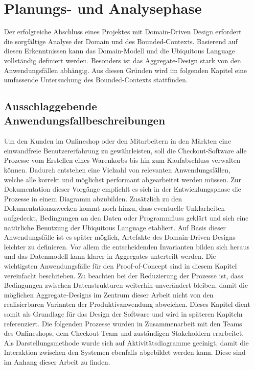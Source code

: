 

\chapter{Planungs- und Analysephase}

Der erfolgreiche Abschluss eines Projektes mit Domain-Driven Design erfordert die sorgfältige Analyse der Domain und des Bounded-Contexts. Basierend auf diesen Erkenntnissen kann das Domain-Modell und die Ubiquitous Language vollständig definiert werden. Besonders ist das Aggregate-Design stark von den Anwendungsfällen abhängig. Aus diesen Gründen wird im folgenden Kapitel eine umfassende Untersuchung des Bounded-Contexts stattfinden.

\section{Ausschlaggebende Anwendungsfallbeschreibungen}

Um den Kunden im Onlineshop oder den Mitarbeitern in den Märkten eine einwandfreie Benutzererfahrung zu gewährleisten, soll die Checkout-Software alle Prozesse vom Erstellen eines Warenkorbs bis hin zum Kaufabschluss verwalten können. Dadurch entstehen eine Vielzahl von relevanten Anwendungsfällen, welche alle korrekt und möglichst performant abgearbeitet werden müssen. Zur Dokumentation dieser Vorgänge empfiehlt es sich in der Entwicklungsphase die Prozesse in einem Diagramm abzubilden. Zusätzlich zu den Dokumentationszwecken kommt noch hinzu, dass eventuelle Unklarheiten aufgedeckt, Bedingungen an den Daten oder Programmfluss geklärt und sich eine natürliche Benutzung der Ubiquitous Language etabliert. Auf Basis dieser Anwendungsfälle ist es später möglich, Artefakte des Domain-Driven Designs leichter zu definieren. Vor allem die entscheidenden Invarianten bilden sich heraus und das Datenmodell kann klarer in Aggregates unterteilt werden. Die wichtigsten Anwendungsfälle für den Proof-of-Concept sind in diesem Kapitel vereinfacht beschrieben. Zu beachten bei der Reduzierung der Prozesse ist, dass Bedingungen zwischen Datenstrukturen weiterhin unverändert bleiben, damit die möglichen Aggregate-Designs im Zentrum dieser Arbeit nicht von den realisierbaren Varianten der Produktivanwendung abweichen. Dieses Kapitel dient somit als Grundlage für das Design der Software und wird in späteren Kapiteln referenziert. Die folgenden Prozesse wurden in Zusammenarbeit mit den Teams des Onlineshops, dem Checkout-Team und zuständigen \Gls{Stakeholder}n erarbeitet. Als Darstellungsmethode wurde sich auf Aktivitätsdiagramme geeinigt, damit die Interaktion zwischen den Systemen ebenfalls abgebildet werden kann. Diese sind im Anhang dieser Arbeit zu finden.

